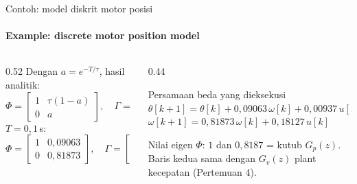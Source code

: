 \documentclass[aspectratio=169,10pt]{beamer}
\begin{document}
\begin{frame}{Contoh: model diskrit motor posisi}
	\framesubtitle{Example: discrete motor position model}
	\begin{columns}[T]
		\begin{column}{0.52\textwidth}
			\small
			Dengan $a = e^{-T/\tau}$, hasil analitik:
			\[
				\Phi = \begin{bmatrix} 1 & \tau(1-a)\\ 0 & a\end{bmatrix},\quad
				\Gamma = \begin{bmatrix} K\big(T - \tau(1-a)\big)\\ K(1-a)\end{bmatrix}
			\]
			$T = 0{,}1$\,s:
			\[
				\Phi = \begin{bmatrix} 1 & 0{,}09063\\ 0 & 0{,}81873\end{bmatrix},\quad
				\Gamma = \begin{bmatrix} 0{,}00937\\ 0{,}18127\end{bmatrix}
			\]
		\end{column}
		\begin{column}{0.44\textwidth}
			\begin{block}{Persamaan beda yang dieksekusi}
				\small
				$\theta[k+1] = \theta[k] + 0{,}09063\,\omega[k] + 0{,}00937\,u[k]$\\
				$\omega[k+1] = 0{,}81873\,\omega[k] + 0{,}18127\,u[k]$
			\end{block}
			\small
			Nilai eigen $\Phi$: $1$ dan $0{,}8187$ = kutub $G_p(z)$.\\[3pt]
			Baris kedua sama dengan $G_v(z)$ plant kecepatan (Pertemuan 4).
		\end{column}
	\end{columns}
\end{frame}
\end{document}
